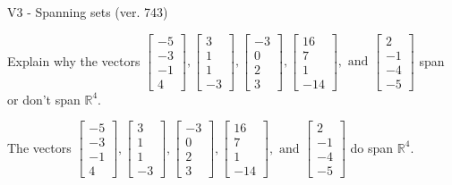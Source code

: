 \begin{exercise}
  \begin{exerciseTitle}V3 - Spanning sets (ver. 743)\end{exerciseTitle}
  \begin{exerciseStatement}
    Explain why the vectors \(\left[\begin{array}{r}
-5 \\
-3 \\
-1 \\
4
\end{array}\right] , \left[\begin{array}{r}
3 \\
1 \\
1 \\
-3
\end{array}\right] , \left[\begin{array}{r}
-3 \\
0 \\
2 \\
3
\end{array}\right] , \left[\begin{array}{r}
16 \\
7 \\
1 \\
-14
\end{array}\right] , \text{ and } \left[\begin{array}{r}
2 \\
-1 \\
-4 \\
-5
\end{array}\right]\) span or don't span \(\mathbb{R}^4\). 
	


  \end{exerciseStatement}
  \begin{exerciseAnswer}
   The vectors \(\left[\begin{array}{r}
-5 \\
-3 \\
-1 \\
4
\end{array}\right] , \left[\begin{array}{r}
3 \\
1 \\
1 \\
-3
\end{array}\right] , \left[\begin{array}{r}
-3 \\
0 \\
2 \\
3
\end{array}\right] , \left[\begin{array}{r}
16 \\
7 \\
1 \\
-14
\end{array}\right] , \text{ and } \left[\begin{array}{r}
2 \\
-1 \\
-4 \\
-5
\end{array}\right]\) 
  	 do  
	span \(\mathbb{R}^4\).
  



\end{exerciseAnswer}
\end{exercise}
